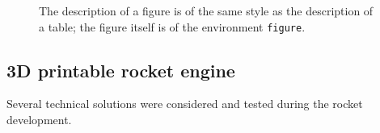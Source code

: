 \documentclass{poster16}
\begin{document}
%
\begin{figure}[ht!]
\begin{center}
%
\caption{The description of a figure is of the same style as the description of a table; the figure itself is of the environment \texttt{figure}.
} 
\label{fig1}
\end{center}
\end{figure}%
%
%
%

\subsection{3D printable rocket engine}

Several technical solutions were considered and tested during the rocket development. 
\end{document}
